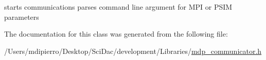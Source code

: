 starts communications parses command line argument for MPI or PSIM parameters 

The documentation for this class was generated from the following file:\begin{CompactItemize}
\item 
/Users/mdipierro/Desktop/SciDac/development/Libraries/\hyperlink{mdp__communicator_8h}{mdp\_\-communicator.h}\end{CompactItemize}
